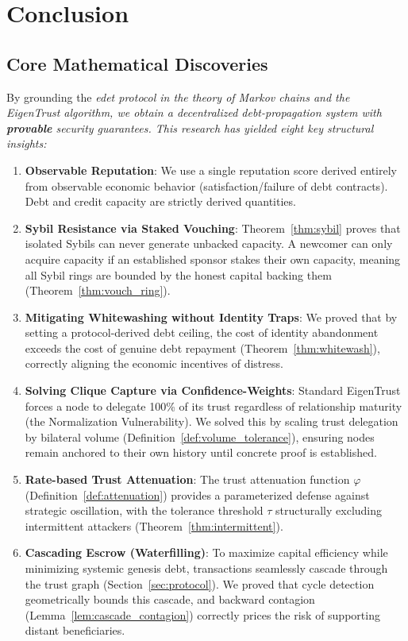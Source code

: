 \documentclass[11pt]{article}
\begin{document}
\section{Conclusion}

\subsection{Core Mathematical Discoveries}

By grounding the \em edet \em protocol in the theory of Markov chains and the EigenTrust algorithm, we obtain a decentralized debt-propagation system with \textbf{provable} security guarantees. This research has yielded eight key structural insights:

\begin{enumerate}
    \item \textbf{Observable Reputation}: We use a single reputation score derived entirely from observable economic behavior (satisfaction/failure of debt contracts). Debt and credit capacity are strictly derived quantities.
    \item \textbf{Sybil Resistance via Staked Vouching}: Theorem~\ref{thm:sybil} proves that isolated Sybils can never generate unbacked capacity. A newcomer can only acquire capacity if an established sponsor stakes their own capacity, meaning all Sybil rings are bounded by the honest capital backing them (Theorem~\ref{thm:vouch_ring}).
    \item \textbf{Mitigating Whitewashing without Identity Traps}: We proved that by setting a protocol-derived debt ceiling, the cost of identity abandonment exceeds the cost of genuine debt repayment (Theorem~\ref{thm:whitewash}), correctly aligning the economic incentives of distress.
    \item \textbf{Solving Clique Capture via Confidence-Weights}: Standard EigenTrust forces a node to delegate 100\% of its trust regardless of relationship maturity (the Normalization Vulnerability). We solved this by scaling trust delegation by bilateral volume (Definition~\ref{def:volume_tolerance}), ensuring nodes remain anchored to their own history until concrete proof is established.
    \item \textbf{Rate-based Trust Attenuation}: The trust attenuation function $\varphi$ (Definition~\ref{def:attenuation}) provides a parameterized defense against strategic oscillation, with the tolerance threshold $\tau$ structurally excluding intermittent attackers (Theorem~\ref{thm:intermittent}).
    \item \textbf{Cascading Escrow (Waterfilling)}: To maximize capital efficiency while minimizing systemic genesis debt, transactions seamlessly cascade through the trust graph (Section~\ref{sec:protocol}). We proved that cycle detection geometrically bounds this cascade, and backward contagion (Lemma~\ref{lem:cascade_contagion}) correctly prices the risk of supporting distant beneficiaries.

\end{enumerate}
\end{document}
